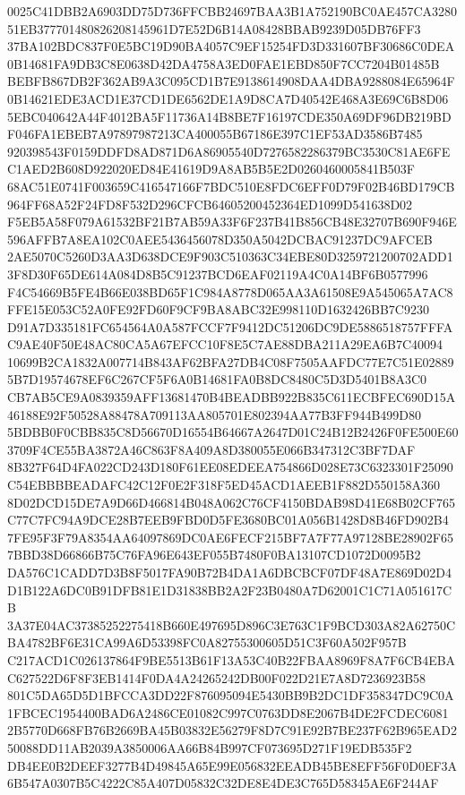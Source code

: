 \documentclass[UTF8,fontset=fandol,zihao=-4,a4paper]{ctexart}
\begin{document}
{{0025C41DBB2A6903DD75D736FFCBB24697BAA3B1A752190BC0AE457CA328051EB377701480826208145961D7E52D6B14A08428BBAB9239D05DB76FF3
37BA102BDC837F0E5BC19D90BA4057C9EF15254FD3D331607BF30686C0DEA0B14681FA9DB3C8E0638D42DA4758A3ED0FAE1EBD850F7CC7204B01485B
BEBFB867DB2F362AB9A3C095CD1B7E9138614908DAA4DBA9288084E65964F0B14621EDE3ACD1E37CD1DE6562DE1A9D8CA7D40542E468A3E69C6B8D06
5EBC040642A44F4012BA5F11736A14B8BE7F16197CDE350A69DF96DB219BDF046FA1EBEB7A97897987213CA400055B67186E397C1EF53AD3586B7485
920398543F0159DDFD8AD871D6A86905540D7276582286379BC3530C81AE6FEC1AED2B608D922020ED84E41619D9A8AB5B5E2D0260460005841B503F
68AC51E0741F003659C416547166F7BDC510E8FDC6EFF0D79F02B46BD179CB964FF68A52F24FD8F532D296CFCB64605200452364ED1099D541638D02
F5EB5A58F079A61532BF21B7AB59A33F6F237B41B856CB48E32707B690F946E596AFFB7A8EA102C0AEE5436456078D350A5042DCBAC91237DC9AFCEB
2AE5070C5260D3AA3D638DCE9F903C510363C34EBE80D3259721200702ADD13F8D30F65DE614A084D8B5C91237BCD6EAF02119A4C0A14BF6B0577996
F4C54669B5FE4B66E038BD65F1C984A8778D065AA3A61508E9A545065A7AC8FFE15E053C52A0FE92FD60F9CF9BA8ABC32E998110D1632426BB7C9230
D91A7D335181FC654564A0A587FCCF7F9412DC51206DC9DE5886518757FFFAC9AE40F50E48AC80CA5A67EFCC10F8E5C7AE88DBA211A29EA6B7C40094
10699B2CA1832A007714B843AF62BFA27DB4C08F7505AAFDC77E7C51E028895B7D19574678EF6C267CF5F6A0B14681FA0B8DC8480C5D3D5401B8A3C0
CB7AB5CE9A0839359AFF13681470B4BEADBB922B835C611ECBFEC690D15A46188E92F50528A88478A709113AA805701E802394AA77B3FF944B499D80
5BDBB0F0CBB835C8D56670D16554B64667A2647D01C24B12B2426F0FE500E603709F4CE55BA3872A46C863F8A409A8D380055E066B347312C3BF7DAF
8B327F64D4FA022CD243D180F61EE08EDEEA754866D028E73C6323301F25090C54EBBBBEADAFC42C12F0E2F318F5ED45ACD1AEEB1F882D550158A360
8D02DCD15DE7A9D66D466814B048A062C76CF4150BDAB98D41E68B02CF765C77C7FC94A9DCE28B7EEB9FBD0D5FE3680BC01A056B1428D8B46FD902B4
7FE95F3F79A8354AA64097869DC0AE6FECF215BF7A7F77A97128BE28902F657BBD38D66866B75C76FA96E643EF055B7480F0BA13107CD1072D0095B2
DA576C1CADD7D3B8F5017FA90B72B4DA1A6DBCBCF07DF48A7E869D02D4D1B122A6DC0B91DFB81E1D31838BB2A2F23B0480A7D62001C1C71A051617CB
3A37E04AC37385252275418B660E497695D896C3E763C1F9BCD303A82A62750CBA4782BF6E31CA99A6D53398FC0A82755300605D51C3F60A502F957B
C217ACD1C026137864F9BE5513B61F13A53C40B22FBAA8969F8A7F6CB4EBAC627522D6F8F3EB1414F0DA4A24265242DB00F022D21E7A8D7236923B58
801C5DA65D5D1BFCCA3DD22F876095094E5430BB9B2DC1DF358347DC9C0A1FBCEC1954400BAD6A2486CE01082C997C0763DD8E2067B4DE2FCDEC6081
2B5770D668FB76B2669BA45B03832E56279F8D7C91E92B7BE237F62B965EAD250088DD11AB2039A3850006AA66B84B997CF073695D271F19EDB535F2
DB4EE0B2DEEF3277B4D49845A65E99E056832EEADB45BE8EFF56F0D0EF3A6B547A0307B5C4222C85A407D05832C32DE8E4DE3C765D58345AE6F244AF
}}
\end{document}
